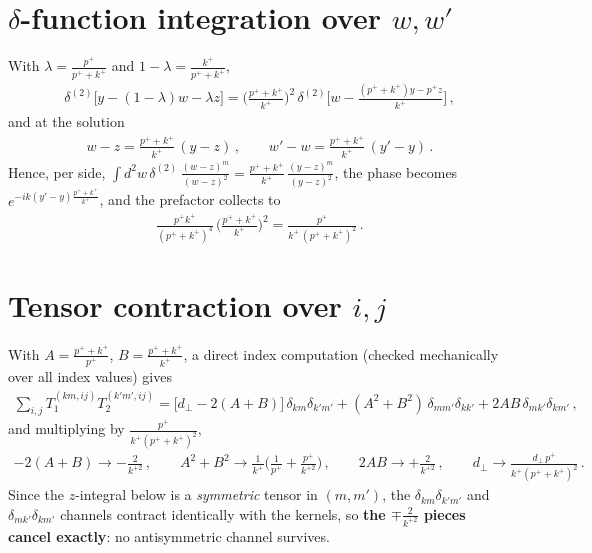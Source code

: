 \documentclass[10pt]{article}
\begin{document}
\section{$\delta$-function integration over $w,w'$}
With $\lambda=\frac{p^{+}}{p^{+}+k^{+}}$ and $1-\lambda=\frac{k^{+}}{p^{+}+k^{+}}$,
\begin{align}
\delta^{(2)}\big[y-(1-\lambda)w-\lambda z\big]=\Big(\frac{p^{+}+k^{+}}{k^{+}}\Big)^{2}\,
\delta^{(2)}\Big[w-\frac{(p^{+}+k^{+})y-p^{+}z}{k^{+}}\Big]\,,
\end{align}
and at the solution
\begin{align}
w-z=\frac{p^{+}+k^{+}}{k^{+}}\,(y-z)\,,\qquad w'-w=\frac{p^{+}+k^{+}}{k^{+}}\,(y'-y)\,.
\end{align}
Hence, per side, $\int d^{2}w\,\delta^{(2)}\,\frac{(w-z)^{m}}{(w-z)^{2}}
=\frac{p^{+}+k^{+}}{k^{+}}\,\frac{(y-z)^{m}}{(y-z)^{2}}$, the phase becomes
$e^{-ik(y'-y)\frac{p^{+}+k^{+}}{k^{+}}}$, and the prefactor collects to
\begin{align}
\frac{p^{+}k^{+}}{(p^{+}+k^{+})^{4}}\,\Big(\frac{p^{+}+k^{+}}{k^{+}}\Big)^{2}
=\frac{p^{+}}{k^{+}\,(p^{+}+k^{+})^{2}}\,.
\end{align}

\section{Tensor contraction over $i,j$}
With $A=\frac{p^{+}+k^{+}}{p^{+}}$, $B=\frac{p^{+}+k^{+}}{k^{+}}$, a direct index computation
(checked mechanically over all index values) gives
\begin{align}
\sum_{i,j}T_{1}^{(km,ij)}T_{2}^{(k'm',ij)}
=\big[d_{\perp}-2(A+B)\big]\,\delta_{km}\delta_{k'm'}+(A^{2}+B^{2})\,\delta_{mm'}\delta_{kk'}
+2AB\,\delta_{mk'}\delta_{km'}\,,
\end{align}
and multiplying by $\frac{p^{+}}{k^{+}(p^{+}+k^{+})^{2}}$,
\begin{align}
-2(A+B)\to-\frac{2}{k^{+2}}\,,\qquad
A^{2}+B^{2}\to\frac{1}{k^{+}}\Big(\frac{1}{p^{+}}+\frac{p^{+}}{k^{+2}}\Big)\,,\qquad
2AB\to+\frac{2}{k^{+2}}\,,\qquad
d_{\perp}\to\frac{d_{\perp}\,p^{+}}{k^{+}(p^{+}+k^{+})^{2}}\,.
\end{align}
Since the $z$-integral below is a \emph{symmetric} tensor in $(m,m')$, the
$\delta_{km}\delta_{k'm'}$ and $\delta_{mk'}\delta_{km'}$ channels contract identically with the
kernels, so \textbf{the $\mp\frac{2}{k^{+2}}$ pieces cancel exactly}: no antisymmetric channel
survives.
\end{document}
